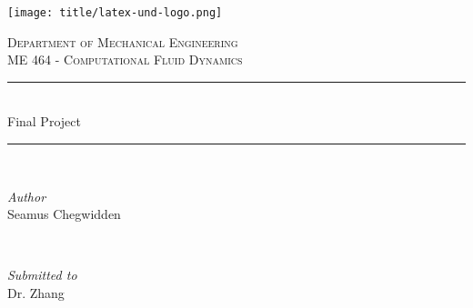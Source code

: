 \begin{titlepage}

\newcommand{\HRule}{\rule{\linewidth}{0.5mm}} %

\centering
\texttt{[image: title/latex-und-logo.png]}\\[1cm] %
 

\center %


\textsc{\Large Department of Mechanical Engineering}\\[0.5cm] 
\textsc{\large ME 464 - Computational Fluid Dynamics}\\[0.5cm] 

\makeatletter
\HRule \\[0.4cm]
{ \huge Final Project}\\[0.4cm] %
\HRule \\[1.5cm]
 

\begin{minipage}[t]{0.4\textwidth}
\begin{flushleft} \large
\emph{Author}\\
Seamus Chegwidden

\end{flushleft}
\end{minipage}
~
\begin{minipage}[t]{0.4\textwidth}
\begin{flushright} \large
\emph{Submitted to} \\
Dr. Zhang \\[1.2em] 
\end{flushright}
\end{minipage}\\[2cm]
\makeatother


\end{titlepage}
